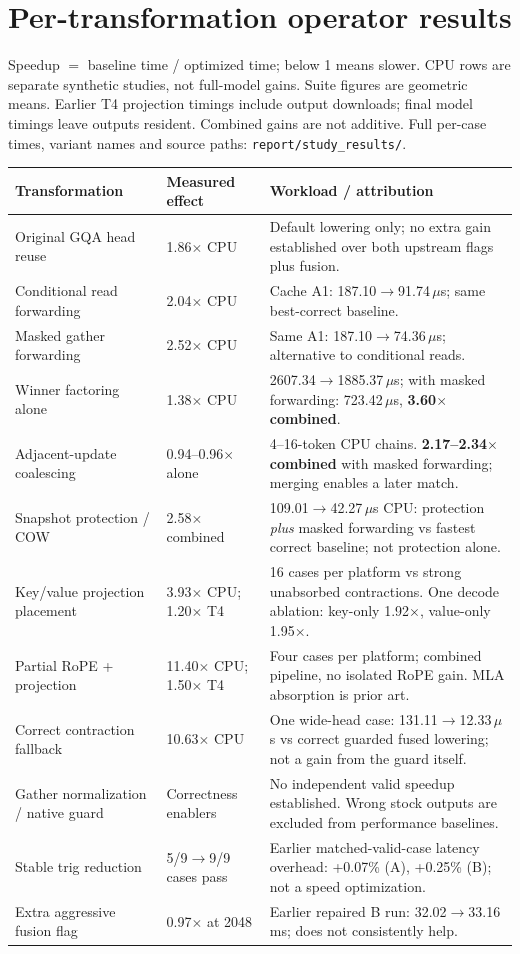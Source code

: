 \documentclass[10pt,a4paper]{article}
\newcommand{\code}[1]{\texttt{#1}}
\newcommand{\smallnote}[1]{{\footnotesize #1\par}}
\begin{document}
\section{Per-transformation operator results}
\smallnote{Speedup $=$ baseline time / optimized time; below 1 means slower. CPU rows are separate synthetic studies, not full-model gains. Suite figures are geometric means. Earlier T4 projection timings include output downloads; final model timings leave outputs resident. Combined gains are not additive. Full per-case times, variant names and source paths: \code{report/study\_results/}.}
{\small
\begin{tabularx}{\linewidth}{@{}P{40mm}P{29mm}Y@{}}
\toprule
\textbf{Transformation} & \textbf{Measured effect} & \textbf{Workload / attribution}\hfill\cite{project}\\
\midrule
Original GQA head reuse &1.86$\times$ CPU&Default lowering only; no extra gain established over both upstream flags plus fusion.\\
Conditional read forwarding &2.04$\times$ CPU&Cache A1: 187.10$\to$91.74\,$\mu$s; same best-correct baseline.\\
Masked gather forwarding &2.52$\times$ CPU&Same A1: 187.10$\to$74.36\,$\mu$s; alternative to conditional reads.\\
Winner factoring alone &1.38$\times$ CPU&2607.34$\to$1885.37\,$\mu$s; with masked forwarding: 723.42\,$\mu$s, \textbf{3.60$\times$ combined}.\\
Adjacent-update coalescing &0.94--0.96$\times$ alone&4--16-token CPU chains. \textbf{2.17--2.34$\times$ combined} with masked forwarding; merging enables a later match.\\
Snapshot protection / COW &2.58$\times$ combined&109.01$\to$42.27\,$\mu$s CPU: protection \emph{plus} masked forwarding vs fastest correct baseline; not protection alone.\\
Key/value projection placement &3.93$\times$ CPU; 1.20$\times$ T4&16 cases per platform vs strong unabsorbed contractions. One decode ablation: key-only 1.92$\times$, value-only 1.95$\times$.\\
Partial RoPE + projection &11.40$\times$ CPU; 1.50$\times$ T4&Four cases per platform; combined pipeline, no isolated RoPE gain. MLA absorption is prior art.\\
Correct contraction fallback &10.63$\times$ CPU&One wide-head case: 131.11$\to$12.33\,$\mu$s vs correct guarded fused lowering; not a gain from the guard itself.\\
Gather normalization / native guard &Correctness enablers&No independent valid speedup established. Wrong stock outputs are excluded from performance baselines.\\
Stable trig reduction &5/9$\to$9/9 cases pass&Earlier matched-valid-case latency overhead: +0.07\% (A), +0.25\% (B); not a speed optimization.\\
Extra aggressive fusion flag &0.97$\times$ at 2048&Earlier repaired B run: 32.02$\to$33.16\,ms; does not consistently help.\\
\bottomrule
\end{tabularx}}
\end{document}
